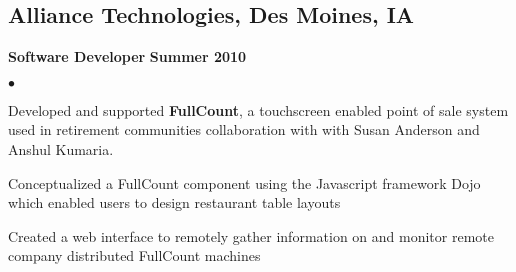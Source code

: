 \documentclass[10pt,letterpaper]{article}
\renewenvironment{itemize}{
  \begin{list}{}{
      \setlength{\leftmargin}{1.5em}
      \setlength{\itemsep}{0.25em}
      \setlength{\parskip}{0pt}
      \setlength{\parsep}{0.25em}
    }
  }{
  \end{list}
}
\newenvironment{bitemize}{
  \begin{list}{\(\bullet \)}{
      \setlength{\leftmargin}{1.5em}
      \setlength{\itemsep}{0.25em}
      \setlength{\parskip}{0pt}
      \setlength{\parsep}{0.25em}
    }
  }{
  \end{list}
}
\newcommand{\yearrange}[1]{\hfill \textbf{#1} \par}
\begin{document}
\subsection*{Alliance Technologies, Des Moines, IA}

\begin{itemize}
  \item \textbf{Software Developer} \yearrange{Summer 2010}
    \begin{bitemize}
    \item Developed and supported \textbf{FullCount}, a touchscreen enabled
      point of sale system used in retirement communities %
      collaboration with with Susan Anderson and Anshul Kumaria.
    \item Conceptualized a FullCount component using the Javascript framework
      Dojo which enabled users to design restaurant table layouts
    \item Created a web interface to remotely gather information on and monitor
      remote company distributed FullCount machines
  \end{bitemize}
\end{itemize}



\end{document}
